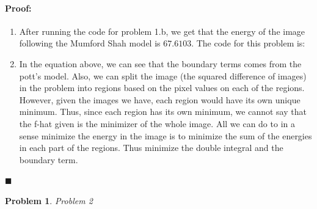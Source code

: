 \documentclass[12pt]{article}
\newenvironment{proof}{\paragraph{Proof: }}{\hfill$\blacksquare$}
\newtheorem{problem}{Problem}%
\begin{document}
\begin{proof}
\begin{enumerate}
\item After running the code for problem 1.b, we get that the energy of the image following the Mumford Shah model is $67.6103$. The code for this problem is:



\item In the equation above, we can see that the boundary terms comes from the pott's model. Also, we can split the image (the squared difference of images) in the problem into regions based on the pixel values on each of the regions. However, given the images we have, each region would have its own unique minimum. Thus, since each region has its own minimum, we cannot say that the f-hat given is the minimizer of the whole image. All we can do to in a sense minimize the energy in the image is to minimize the sum of the energies in each part of the regions. Thus minimize the double integral and the boundary term.

\end{enumerate}

\end{proof}


\begin{problem}
\normalfont
Problem 2
\end{problem}
\end{document}
